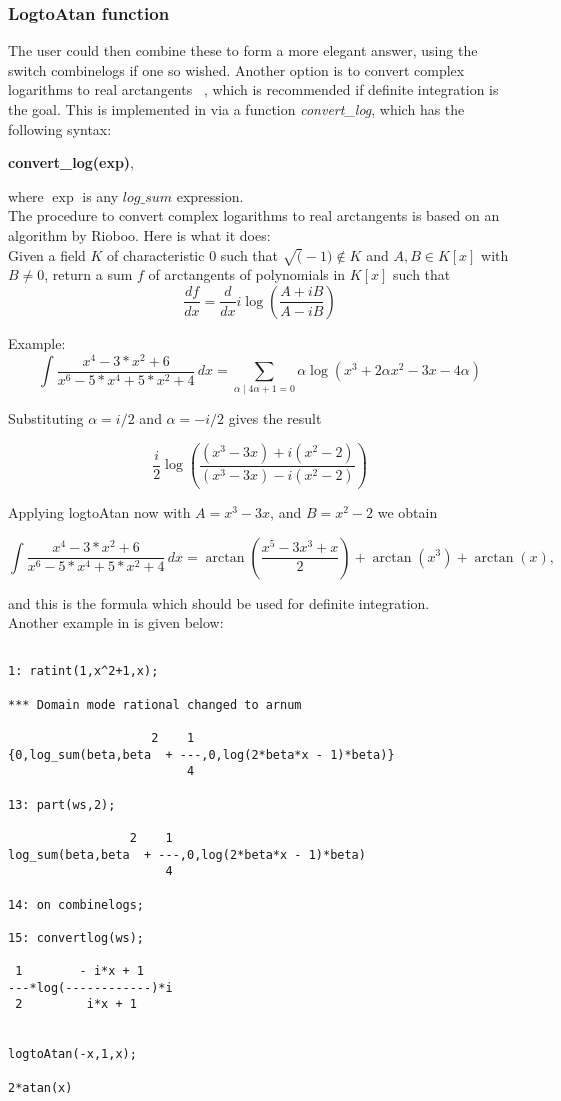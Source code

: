 \subsubsection{LogtoAtan function}
The user could then combine these to form a more elegant answer, using the switch combinelogs if one so wished. Another option is to convert complex logarithms to real arctangents ~\cite{Bronstein:97}, which is recommended if definite integration is the goal. This is implemented in \REDUCE via a function \emph{convert\_log}, which has the following syntax:
\begin{center} \textbf{convert\_log(exp)}, \end{center}
where $\exp$ is any $log\_sum$ expression.\\[\baselineskip]
%
The procedure to convert complex logarithms to real arctangents is based on an algorithm by Rioboo. Here is what it does: \\[\baselineskip]
%
Given a field $K$ of characteristic 0 such that $\sqrt(-1) \not\in K$ and 
$A, B \in K[x]$ with $B \not = 0$, return a sum $f$ of arctangents of polynomials in $K[x]$ such that
\[  \frac{df}{dx}=\frac{d}{dx} i \log(\frac{A+ i B}{A- i B}) \]

Example:
\[ \int \frac{x^4-3*x^2+6}{x^6-5*x^4+5*x^2+4} \, dx = \sum_{ \alpha \mid 4\alpha+1=0} \alpha \log(x^3+2\alpha x^2-3 x-4 \alpha) \]

Substituting $\alpha=i/2$ and $\alpha=-i/2$ gives the result

\[ \frac{i}{2} \log(\frac{(x^3-3 x)+i (x^2-2)}{(x^3-3 x)-i (x^2-2)}) \]

Applying logtoAtan now with $A=x^3-3 x$, and $B=x^2-2$ we obtain

\[ \int \frac{x^4-3*x^2+6}{x^6-5*x^4+5*x^2+4} \, dx = \arctan(\frac{x^5-3 x^3+x}{2})+\arctan(x^3)+\arctan(x) , \]

and this is the formula which should be used for definite integration. \\[\baselineskip]
%
Another example in \REDUCE is given below:
\begin{verbatim}

1: ratint(1,x^2+1,x);

*** Domain mode rational changed to arnum

                    2    1
{0,log_sum(beta,beta  + ---,0,log(2*beta*x - 1)*beta)}
                         4

13: part(ws,2);

                 2    1
log_sum(beta,beta  + ---,0,log(2*beta*x - 1)*beta)
                      4

14: on combinelogs;

15: convertlog(ws);

 1        - i*x + 1
---*log(------------)*i 
 2         i*x + 1


logtoAtan(-x,1,x);

2*atan(x) 

\end{verbatim}
